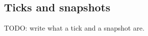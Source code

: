 \IfFileExists{IEEEtran.cls}{\ieeetrue\documentclass[conference]{IEEEtran}}{\ieeefalse\documentclass[twocolumn,10pt]{article}}
\begin{document}
\subsection{Ticks and snapshots}
TODO: write what a tick and a snapshot are.
\end{document}
